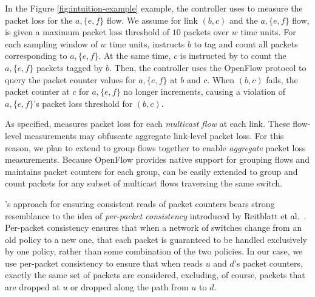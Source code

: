 In the Figure \ref{fig:intuition-example} example, the controller uses \fl to measure the packet loss for the $a,\{e,f\}$ flow.  
We assume for link $(b,c)$ and the $a,\{e,f\}$ flow, \fl is given a maximum packet loss threshold of $10$ packets over $w$ time units.
For each sampling window of $w$ time units, \pcnt instructs $b$ to tag and count all packets corresponding to $a,\{e,f\}$. 
At the same time, $c$ is instructed by \pcnt to count the $a,\{e,f\}$ packets tagged by $b$. Then, the controller uses the OpenFlow protocol to query the packet counter values for $a,\{e,f\}$
at $b$ and $c$.  When $(b,c)$ fails, the packet counter at $c$ for $a,\{e,f\}$ no longer increments, causing a violation of $a,\{e,f\}$'s packet loss threshold for $(b,c)$.

As specified, \fl measures packet loss for each \emph{multicast flow} at each link.  These flow-level measurements may obfuscate aggregate link-level packet loss. For this
reason, we plan to extend \fl to group flows together to enable \emph{aggregate} packet loss measurements. 
Because OpenFlow provides native support for grouping flows and maintains packet counters for each 
group, \fl can be easily extended to group and count packets for any subset of multicast flows traversing the same switch.


\pcnts's approach for ensuring consistent reads of packet counters bears strong resemblance to the idea of \emph{per-packet consistency} introduced by Reitblatt et al.~\cite{Reitblatt11}.
Per-packet consistency ensures that when a network of switches change from an old policy to a new one, that
each packet is guaranteed to be handled exclusively by one policy, rather than some combination of the two policies.  In our case, we use per-packet consistency to ensure that when \pcnt reads
$u$ and $d$'s packet counters, exactly the same set of packets are considered, excluding, of course, packets that are dropped at $u$ or dropped along the path from $u$ to $d$. 

















